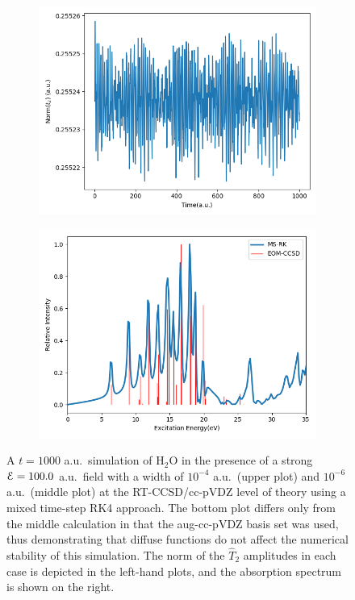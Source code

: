 \begin{figure}
\begin{subfigure}{0.475\textwidth}
        \includegraphics[width=\textwidth]{ch3/Figs/4-8.png}
    \end{subfigure}
    \hfill
    \begin{subfigure}{0.475\textwidth}
        \centering
        \includegraphics[width=\textwidth]{ch3/Figs/4-9.png}
    \end{subfigure}

    \caption{A $t=1000$ a.u.\ simulation of H$_2$O in the presence of a
    strong ${\cal E} = 100.0$ a.u.\ field with a width of $10^{-4}$ a.u.\
    (upper plot) and $10^{-6}$ a.u.\ (middle plot) at the RT-CCSD/cc-pVDZ
    level of theory using a mixed time-step RK4 approach. The bottom plot differs only from the middle calculation in
    that the aug-cc-pVDZ basis set was used, thus demonstrating that diffuse functions do not affect the numerical
    stability of this simulation.
    The norm of the
    $\hat{T}_2$ amplitudes in each case is depicted in the left-hand plots, and the
    absorption spectrum is shown on the right.}
\label{fig:ms-results}
\end{figure} 

